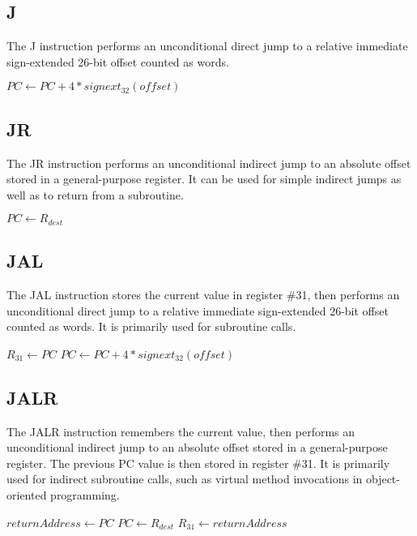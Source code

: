 \subsection{J}

The J instruction performs an unconditional direct jump to a relative immediate sign-extended 26-bit offset counted as words.


\begin{effectize}
\effect $PC \leftarrow PC + 4 * signext_{32}(offset)$
\end{effectize}

\subsection{JR}

The JR instruction performs an unconditional indirect jump to an absolute offset stored in a general-purpose register. It can be used for simple indirect jumps as well as to return from a subroutine.


\begin{effectize}
\effect $PC \leftarrow R_{dest}$
\end{effectize}

\subsection{JAL}

The JAL instruction stores the current \pc value in register \#31, then performs an unconditional direct jump to a relative immediate sign-extended 26-bit offset counted as words. It is primarily used for subroutine calls.


\begin{effectize}
\effect $R_{31} \leftarrow PC$
\effect $PC \leftarrow PC + 4 * signext_{32}(offset)$
\end{effectize}

\subsection{JALR}

The JALR instruction remembers the current \pc value, then performs an unconditional indirect jump to an absolute offset stored in a general-purpose register. The previous PC value is then stored in register \#31. It is primarily used for indirect subroutine calls, such as virtual method invocations in object-oriented programming.


\begin{effectize}
\effect $returnAddress \leftarrow PC$
\effect $PC \leftarrow R_{dest}$
\effect $R_{31} \leftarrow returnAddress$
\end{effectize}



